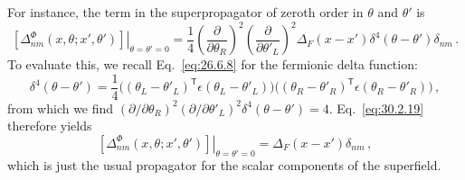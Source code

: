 For instance, the term in the superpropagator of zeroth order in \(\theta\)
and \(\theta'\) is
\begin{equation}
  \left.
  \left[\Delta^\Phi_{nm}(x,\theta;x',\theta')\right]
  \right|_{\theta=\theta'=0}
  =\frac14
    \left(\frac{\partial}{\partial\theta_R}\right)^2
    \left(\frac{\partial}{\partial\theta'_L}\right)^2
    \Delta_F(x-x')\delta^4(\theta-\theta')\delta_{nm}\,.
  \tag{30.2.19}\label{eq:30.2.19}
\end{equation}
To evaluate this, we recall Eq.~\eqref{eq:26.6.8} for the fermionic delta
function:
\[
  \delta^4(\theta-\theta')
  =\frac14
    \bigl((\theta_L-\theta'_L)^{\mathsf T}\epsilon(\theta_L-\theta'_L)\bigr)
    \bigl((\theta_R-\theta'_R)^{\mathsf T}\epsilon(\theta_R-\theta'_R)\bigr)\,,
\]
from which we find
\((\partial/\partial\theta_R)^2
(\partial/\partial\theta'_L)^2\delta^4(\theta-\theta')=4\).
Eq.~\eqref{eq:30.2.19} therefore yields
\begin{equation}
  \left.
  \left[\Delta^\Phi_{nm}(x,\theta;x',\theta')\right]
  \right|_{\theta=\theta'=0}
  =\Delta_F(x-x')\delta_{nm}\,,
  \tag{30.2.20}\label{eq:30.2.20}
\end{equation}
which is just the usual propagator for the scalar components of the
superfield.

